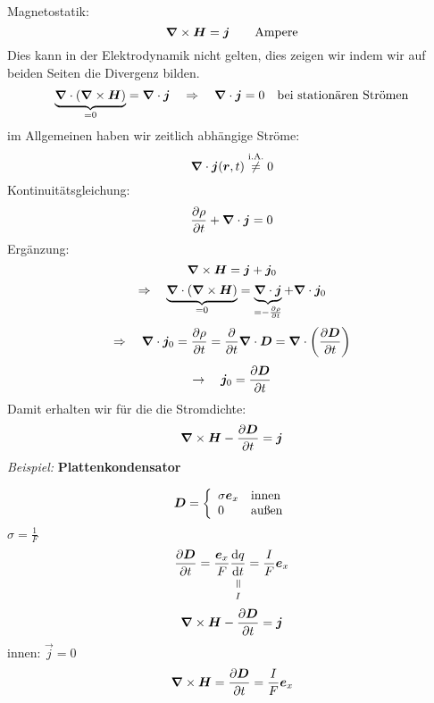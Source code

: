 Magnetostatik:
\begin{equation*}
\bm{\nabla} \times \bm{H} = \bm{j} \qquad \textrm{Ampere}
\end{equation*}
Dies kann in der Elektrodynamik nicht gelten, dies zeigen wir indem wir auf beiden Seiten die Divergenz bilden.
\begin{equation*}
\underbrace{\bm{\nabla} \cdot (\bm{\nabla} \times \bm{H})}_{=0} = \bm{\nabla} \cdot \bm{j} \quad \Rightarrow \quad \bm{\nabla} \cdot \bm{j} = 0 \quad \textrm{bei stationären Strömen}
\end{equation*}
im Allgemeinen haben wir zeitlich abhängige Ströme:
\begin{equation*}
\bm{\nabla} \cdot \bm{j}(\bm{r},t) \overset{\textrm{i.A.}}{\neq} 0
\end{equation*}
Kontinuitätsgleichung:
\begin{equation*}
\frac{\partial \rho}{\partial t} + \bm{\nabla} \cdot \bm{j} = 0
\end{equation*}
Ergänzung:
\begin{equation*}
\bm{\nabla} \times \bm{H} = \bm{j} + \bm{j}_0
\end{equation*}
\begin{equation*}
\Rightarrow \quad \underbrace{\bm{\nabla} \cdot (\bm{\nabla} \times \bm{H})}_{= 0} = \underbrace{\bm{\nabla} \cdot \bm{j}}_{= - \frac{\partial \rho}{\partial t}} + \bm{\nabla} \cdot \bm{j}_0
\end{equation*}
\begin{equation*}
\Rightarrow \quad \bm{\nabla} \cdot \bm{j}_0 = \frac{\partial \rho}{\partial t} = \frac{\partial }{\partial t} \bm{\nabla} \cdot \bm{D} = \bm{\nabla} \cdot \left(\frac{\partial \bm{D}}{\partial t}\right)
\end{equation*}
\begin{equation*}
\rightarrow \quad \bm{j}_0 = \frac{\partial \bm{D}}{\partial t}
\end{equation*}
Damit erhalten wir für die die Stromdichte:
\begin{equation*}
\bm{\nabla} \times \bm{H} - \frac{\partial \bm{D}}{\partial t} = \bm{j}
\end{equation*}
\emph{Beispiel:} \textbf{Plattenkondensator}\\
\begin{minipage}{.6\linewidth}
	\begin{equation*}
	\bm{D} = \left\{ \begin{array}{ll} {\sigma \bm{e}_x} & {\textrm{innen}} \\ {0} & {\textrm{außen}} \end{array} \right.
	\end{equation*}
	$ \sigma = \frac{1}{F} $
	\begin{equation*}
	\prt{\vec{D}}{t} = \frac{\vec{e}_x}{F} \equalto{\prd{q}{t}}{I} = \frac{I}{F} \vec{e}_x
	\end{equation*}
	\begin{equation*}
	\bm{\nabla} \times \bm{H} - \frac{\partial \bm{D}}{\partial t} = \bm{j}
	\end{equation*}
	innen: $ \vec{j} = 0 $
	\begin{equation*}
	\bm{\nabla} \times \bm{H} = \frac{\partial \bm{D}}{\partial t} =  \frac{I}{F} \bm{e}_x
	\end{equation*}
\end{minipage}%
